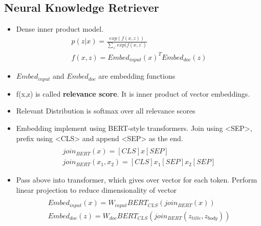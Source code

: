 \documentclass[a4paper]{article}
\begin{document}
\subsection{Neural Knowledge Retriever}
\begin{itemize}
    \item Dense inner product model.
        \begin{equation}
            \begin{split}
                p(z|x) = \frac{exp(f(x,z))}{\sum_{z^'} exp(f(x,z^')}
                \\ f(x,z) = Embed_{input}(x)^TEmbed_{doc}(z)
            \end{split}
        \end{equation}
    \item $Embed_{input}$ and $Embed_{doc}$ are embedding functions
    \item f(x,z) is called \textbf{relevance score}. It is inner product of vector embeddings. 
    \item Relevant Distribution is softmax over all relevance scores 
    \item Embedding implement using BERT-style transformers. Join using <SEP>, prefix using <CLS> and append <SEP> as the end.
        \begin{equation}
            \begin{split}
                \\ join_{BERT}(x) = [CLS]x[SEP]
                \\ join_{BERT}(x_1, x_2) = [CLS]x_1[SEP]x_2[SEP]
            \end{split}
        \end{equation}
    \item Pass above into transformer, which gives over vector for each token. Perform linear projection to reduce dimensionality of vector
        \begin{equation}
            \begin{split}
                \\ Embed_{input}(x) = W_{input}BERT_{CLS}(join_{BERT}(x))
                \\ Embed_{doc}(z) = W_{doc}BERT_{CLS}(join_{BERT}(z_{title}, z_{body}))
            \end{split}
        \end{equation}
\end{itemize}
\end{document}

